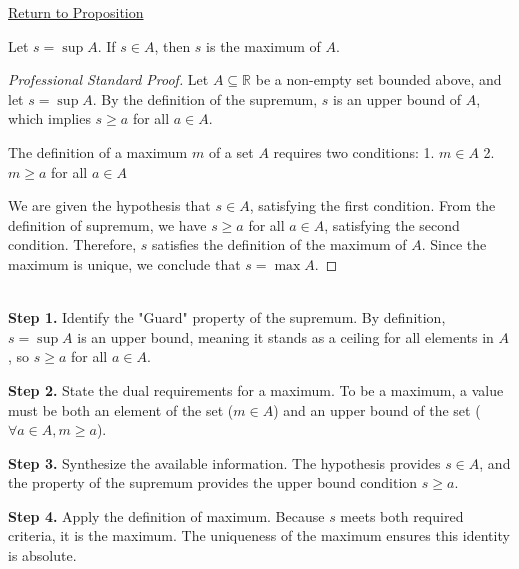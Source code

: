 \newpage
{}
\label{prf:supremum-in-the-set-is-the-maximum}

\begin{remark*}[Return]
\hyperref[prop:supremum-in-the-set-is-the-maximum]{Return to Proposition}
\end{remark*}

\begin{theorem*}
Let $s = \sup A$. If $s \in A$, then $s$ is the maximum of $A$.
\end{theorem*}

\begin{proof}[Professional Standard Proof]
\LRAProofBodyStart
Let $A \subseteq \mathbb{R}$ be a non-empty set bounded above, and let $s = \sup A$. By the definition of the supremum, $s$ is an upper bound of $A$, which implies $s \ge a$ for all $a \in A$. 

The definition of a maximum $m$ of a set $A$ requires two conditions:
1. $m \in A$
2. $m \ge a$ for all $a \in A$

We are given the hypothesis that $s \in A$, satisfying the first condition. From the definition of supremum, we have $s \ge a$ for all $a \in A$, satisfying the second condition. Therefore, $s$ satisfies the definition of the maximum of $A$. Since the maximum is unique, we conclude that $s = \max A$.
\end{proof}

\begin{remark*}~\\
\textbf{Step 1.} Identify the "Guard" property of the supremum. By definition, $s = \sup A$ is an upper bound, meaning it stands as a ceiling for all elements in $A$, so $s \ge a$ for all $a \in A$.

\textbf{Step 2.} State the dual requirements for a maximum. To be a maximum, a value must be both an element of the set ($m \in A$) and an upper bound of the set ($\forall a \in A, m \ge a$).

\textbf{Step 3.} Synthesize the available information. The hypothesis provides $s \in A$, and the property of the supremum provides the upper bound condition $s \ge a$.

\textbf{Step 4.} Apply the definition of maximum. Because $s$ meets both required criteria, it is the maximum. The uniqueness of the maximum ensures this identity is absolute.
\end{remark*}

